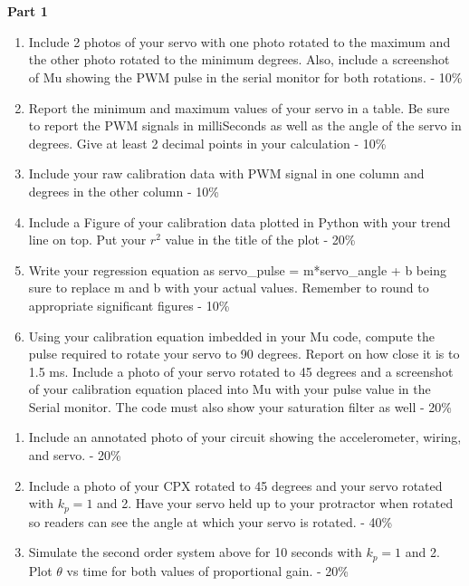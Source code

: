 
\ \\
\ \\
{\bf Part 1}
\begin{enumerate}[itemsep=-5pt]
\item Include 2 photos of your servo with one photo rotated to the maximum and the other photo rotated to the minimum degrees. Also, include a screenshot of Mu showing the PWM pulse in the serial monitor for both rotations. - 10\%
\item Report the minimum and maximum values of your servo in a table. Be sure to report the PWM signals in milliSeconds as well as the angle of the servo in degrees. Give at least 2 decimal points in your calculation - 10\%
\item Include your raw calibration data with PWM signal in one column and degrees in the other column - 10\%
\item Include a Figure of your calibration data plotted in Python with your trend line on top. Put your $r^2$ value in the title of the plot - 20\%
\item Write your regression equation as servo\_pulse = m*servo\_angle + b being sure to replace m and b with your actual values. Remember to round to appropriate significant figures - 10\% 
\item Using your calibration equation imbedded in your Mu code, compute the pulse required to rotate your servo to 90 degrees. Report on how close it is to 1.5 ms. Include a photo of your servo rotated to 45 degrees and a screenshot of your calibration equation placed into Mu with your pulse value in the Serial monitor. The code must also show your saturation filter as well - 20\%
\end{enumerate}

\begin{enumerate}[itemsep=-5pt]
\item Include an annotated photo of your circuit showing the accelerometer, wiring, and servo. - 20\%
\item Include a photo of your CPX rotated to 45 degrees and your servo rotated with $k_p=1$ and 2. Have your servo held up to your protractor when rotated so readers can see the angle at which your servo is rotated. - 40\%
\item Simulate the second order system above for 10 seconds with $k_p=1$ and 2. Plot $\theta$ vs time for both values of proportional gain. - 20\%
\end{enumerate}
